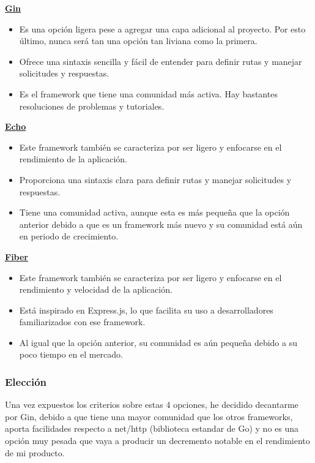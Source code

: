 \textbf{\href{https://pkg.go.dev/github.com/gin-gonic/gin}{Gin}}

\begin{itemize}
\item
  Es una opción ligera pese a agregar una capa adicional al proyecto. Por esto último, nunca será tan una opción tan liviana como la primera.
\item
  Ofrece una sintaxis sencilla y fácil de entender para definir rutas y manejar solicitudes y respuestas.
\item
  Es el framework que tiene una comunidad más activa. Hay bastantes resoluciones de problemas y tutoriales.
\end{itemize}

\textbf{\href{https://pkg.go.dev/github.com/labstack/echo/v4}{Echo}}

\begin{itemize}
\item
  Este framework también se caracteriza por ser ligero y enfocarse en el rendimiento de la aplicación.
\item
  Proporciona una sintaxis clara para definir rutas y manejar solicitudes y respuestas. 
\item
  Tiene una comunidad activa, aunque esta es más pequeña que la opción anterior debido a que es un framework más nuevo y su comunidad está aún en periodo de crecimiento.
\end{itemize}

\textbf{\href{https://pkg.go.dev/github.com/gofiber/fiber/v2}{Fiber}}

\begin{itemize}
\item
  Este framework también se caracteriza por ser ligero y enfocarse en el rendimiento y velocidad de la aplicación.
\item
  Está inspirado en Express.js, lo que facilita su uso a desarrolladores familiarizados con ese framework. 
\item
  Al igual que la opción anterior, su comunidad es aún pequeña debido a su poco tiempo en el mercado.
\end{itemize}

\subsubsection{Elección}

Una vez expuestos los criterios sobre estas 4 opciones, he decidido decantarme por Gin, debido a que tiene una mayor comunidad que los 
otros frameworks, aporta facilidades respecto a net/http (biblioteca estandar de Go) y no es una opción muy pesada que vaya a producir un 
decremento notable en el rendimiento de mi producto.


